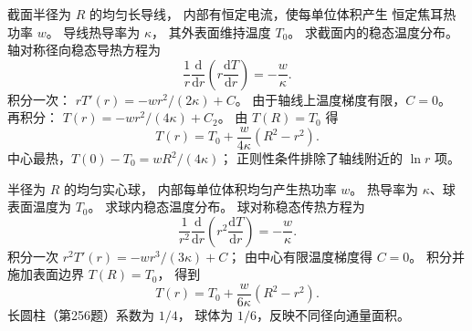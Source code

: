 截面半径为 $R$ 的均匀长导线，
内部有恒定电流，使每单位体积产生
恒定焦耳热功率 $w$。
导线热导率为 $\kappa$，
其外表面维持温度 $T_0$。
求截面内的稳态温度分布。
\exsolution
轴对称径向稳态导热方程为
\[
\frac1r\frac{\mathrm d}{\mathrm dr}
\left(r\frac{\mathrm dT}{\mathrm dr}\right)
=-\frac w\kappa.
\]
积分一次：
$rT'(r)=-wr^2/(2\kappa)+C$。
由于轴线上温度梯度有限，$C=0$。
再积分：
$T(r)=-wr^2/(4\kappa)+C_2$。
由 $T(R)=T_0$ 得
\[
\boxed{T(r)=T_0+\frac w{4\kappa}(R^2-r^2)}.
\]
\excheck 中心最热，$T(0)-T_0=wR^2/(4\kappa)$；
正则性条件排除了轴线附近的 $\ln r$ 项。

半径为 $R$ 的均匀实心球，
内部每单位体积均匀产生热功率 $w$。
热导率为 $\kappa$、球表面温度为 $T_0$。
求球内稳态温度分布。
\exsolution
球对称稳态传热方程为
\[
\frac1{r^2}\frac{\mathrm d}{\mathrm dr}
\left(r^2\frac{\mathrm dT}{\mathrm dr}\right)
=-\frac w\kappa.
\]
积分一次
$r^2T'(r)=-wr^3/(3\kappa)+C$；
由中心有限温度梯度得 $C=0$。
积分并施加表面边界 $T(R)=T_0$，
得到
\[
\boxed{T(r)=T_0+\frac w{6\kappa}(R^2-r^2)}.
\]
\excheck 长圆柱（第256题）系数为 $1/4$，
球体为 $1/6$，反映不同径向通量面积。
